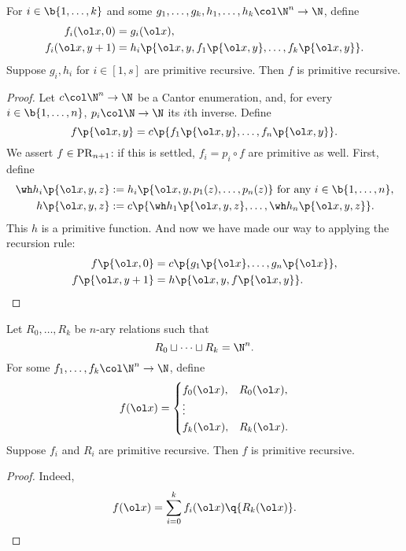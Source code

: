 \begin{theorem}
  For $i \in \b{1, \dots, k}$ and some $g_1, \dots, g_k, h_1, \dots, h_k \col \N^n \to \N$, define
  \begin{align*}
    f_i(\ol x , 0) &= g_i(\ol x), \\
    f_i(\ol x, y+1) &= h_i\p{\ol x, y, f_1\p{\ol x, y}, \dots, f_k\p{\ol x, y}}.
  \end{align*}
  Suppose $g_i, h_i$ for $i \in [1, s]$ are primitive recursive. Then $f$ is primitive recursive.
\end{theorem}

\begin{proof}
  Let $c \col \N^n \to \N$ be a Cantor enumeration, and, for every $i \in \b{1, \dots, n}$, $p_i \col \N \to \N$ its $i$th inverse. Define
  $$ f\p{\ol x, y} = c\p{f_1\p{\ol x, y}, \dots, f_n\p{\ol x, y}}. $$
  We assert $f \in \operatorname{PR}_{n+1}$: if this is settled, $f_i = p_i \circ f$ are primitive as well.
  First, define 
  \begin{align*}
    \wh h_i\p{\ol x, y, z} &:= h_i\p{\ol x, y, p_1(z), \dots, p_n(z)} \text{ for any $i \in \b{1, \dots, n}$}, \\
    h\p{\ol x, y, z} &:= c\p{\wh h_1\p{\ol x, y, z}, \dots, \wh h_n\p{\ol x, y, z}}.
  \end{align*}
  This $h$ is a primitive function.
  And now we have made our way to applying the recursion rule:
  \begin{align*}
    f\p{\ol x, 0} &= c\p{g_1\p{\ol x}, \dots, g_n\p{\ol x}}, \\
    f\p{\ol x, y+1} &= h\p{\ol x, y, f\p{\ol x, y}}.
  \end{align*}
\end{proof}

\begin{theorem}
  Let $R_0, \dots, R_k$ be $n$-ary relations such that
  $$ R_0 \sqcup \dots \sqcup R_k = \N^n. $$
  For some $f_1, \dots, f_k \col \N^n \to \N$, define
  $$
  f(\ol x) =
  \begin{cases}
    f_0(\ol x), & R_0(\ol x), \\
    \vdots \\
    f_k(\ol x ), & R_k(\ol x).
  \end{cases}
  $$
  Suppose $f_i$ and $R_i$ are primitive recursive. Then $f$ is primitive recursive.
\end{theorem}

\begin{proof}
  Indeed,
  $$ f(\ol x) = \sum_{i=0}^k f_i(\ol x) \q{R_k(\ol x)}. $$
\end{proof}

